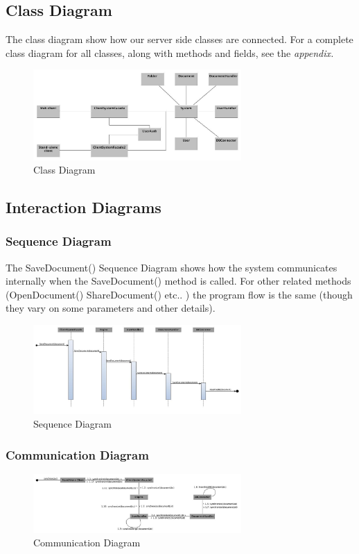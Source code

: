 \documentclass[11pt]{article}
\begin{document}
\subsection{Class Diagram}
\label{sec-3-1}
The class diagram show how our server side classes are connected. For a complete class diagram for all classes, along with methods and fields, see the \emph{appendix.}
\begin{figure}[H]
  		\centering
    	\includegraphics[width=300px]{images/LatestClassDiagram.jpg}
    	\caption{Class Diagram}
\end{figure}
\subsection{Interaction Diagrams}
\label{sec-3-2}
\subsubsection{Sequence Diagram}
\label{sec-3-2-1}
The SaveDocument() Sequence Diagram shows how the system communicates internally when the SaveDocument() method is called.
For other related methods (OpenDocument() ShareDocument() etc.. ) the program flow is the same (though they vary on some parameters and other details).
\begin{figure}[H]
  		\centering
    	\includegraphics[width=300px]{images/SequenceDiagram_SaveDocument.jpg}
    	\caption{Sequence Diagram}
\end{figure}

\subsubsection{Communication Diagram}
\label{sec-3-2-2}
\begin{figure}[H]
  		\centering
    	\includegraphics[width=300px]{images/CommunicationDiagram_Synchronize.jpg}
    	\caption{Communication Diagram}
\end{figure}
\end{document}

